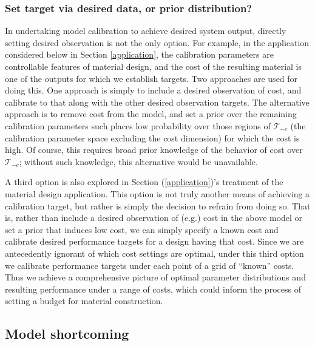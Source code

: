 \documentclass{article}
\begin{document}
\subsubsection{Set target via desired data, or prior distribution?}

In undertaking model calibration to achieve desired system output, directly setting desired observation is not the only option. For example, in the application considered below in Section \ref{application}, the calibration parameters are controllable features of material design, and the cost of the resulting material is one of the outputs for which we establish targets. Two approaches are used for doing this. One approach is simply to include a desired observation of cost, and calibrate to that along with the other desired observation targets. The alternative approach is to remove cost from the model, and set a prior over the remaining calibration parameters such places low probability over those regions of $\mathcal T_{-c}$ (the calibration parameter space excluding the cost dimension) for which the cost is high. Of course, this requires broad prior knowledge of the behavior of cost over $\mathcal T_{-c}$; without such knowledge, this alternative would be unavailable.

A third option is also explored in Section (\ref{application})'s treatment of the material design application. This option is not truly another means of achieving a calibration target, but rather is simply the decision to refrain from doing so. That is, rather than include a desired observation of (e.g.) cost in the above model or set a prior that induces low cost, we can simply specify a known cost and calibrate desired performance targets for a design having that cost. Since we are antecedently ignorant of which cost settings are optimal, under this third option we calibrate performance targets under each point of a grid of ``known'' costs. Thus we achieve a comprehensive picture of optimal parameter distributions and resulting performance under a range of costs, which could inform the process of setting a budget for material construction.

\subsection{Model shortcoming}
\end{document}
